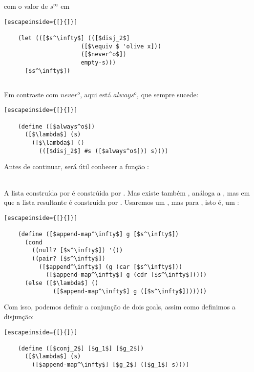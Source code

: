 \documentclass{article}
\begin{document}
  \noindent com o valor de $s^\infty$ em

  \begin{lstlisting}[escapeinside={[}{]}]

    (let (([$s^\infty$] (([$disj_2$]
                      ([$\equiv $ 'olive x]))
                      ([$never^o$])
                      empty-s)))
      [$s^\infty$])
                      
  \end{lstlisting}

  Em contraste com $never^o$, aqui está $always^o$, que sempre sucede:

  \begin{lstlisting}[escapeinside={[}{]}]

    (define ([$always^o$])
      ([$\lambda$] (s)
        ([$\lambda$] ()
          (([$disj_2$] #s ([$always^o$])) s))))

  \end{lstlisting}

  Antes de continuar, será útil conhecer a função :\\
   \seta\ 

  \noindent A lista construída por  é constrúida por
  . Mas existe também , análoga
  a , mas em que a lista resultante é construída por
  . Usaremos um , mas para
  , isto é, um :

  \begin{lstlisting}[escapeinside={[}{]}]

    (define ([$append-map^\infty$] g [$s^\infty$])
      (cond
        ((null? [$s^\infty$]) '())
        ((pair? [$s^\infty$])
          ([$append^\infty$] (g (car [$s^\infty$]))
            ([$append-map^\infty$] g (cdr [$s^\infty$]))))
      (else ([$\lambda$] ()
              ([$append-map^\infty$] g ([$s^\infty$]))))))

  \end{lstlisting}

  Com isso, podemos definir a conjunção de dois goals, assim como
  definimos a disjunção:

  \begin{lstlisting}[escapeinside={[}{]}]

    (define ([$conj_2$] [$g_1$] [$g_2$])
      ([$\lambda$] (s)
        ([$append-map^\infty$] [$g_2$] ([$g_1$] s))))

  \end{lstlisting}
\end{document}

